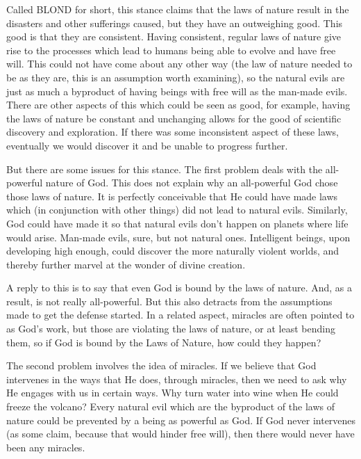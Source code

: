 Called BLOND for short, this stance claims that the laws of nature result in the disasters and other sufferings caused, but they have an outweighing good. This good is that they are consistent. Having consistent, regular laws of nature give rise to the processes which lead to humans being able to evolve and have free will. This could not have come about any other way (the law of nature needed to be as they are, this is an assumption worth examining), so the natural evils are just as much a byproduct of having beings with free will as the man-made evils. There are other aspects of this which could be seen as good, for example, having the laws of nature be constant and unchanging allows for the good of scientific discovery and exploration. If there was some inconsistent aspect of these laws, eventually we would discover it and be unable to progress further. 

But there are some issues for this stance. The first problem deals with the all-powerful nature of God. This does not explain why an all-powerful God chose those laws of nature. It is perfectly conceivable that He could have made laws which (in conjunction with other things) did not lead to natural evils. Similarly, God could have made it so that natural evils don’t happen on planets where life would arise. Man-made evils, sure, but not natural ones. Intelligent beings, upon developing high enough, could discover the more naturally violent worlds, and thereby further marvel at the wonder of divine creation.

A reply to this is to say that even God is bound by the laws of nature. And, as a result, is not really all-powerful. But this also detracts from the assumptions made to get the defense started.  In a related aspect, miracles are often pointed to as God’s work, but those are violating the laws of nature, or at least bending them, so if God is bound by the Laws of Nature, how could they happen?

The second problem involves the idea of miracles. If we believe that God intervenes in the ways that He does, through miracles, then we need to ask why He engages with us in certain ways. Why turn water into wine when He could freeze the volcano? Every natural evil which are the byproduct of the laws of nature could be prevented by a being as powerful as God. If God never intervenes (as some claim, because that would hinder free will), then there would never have been any miracles. 
